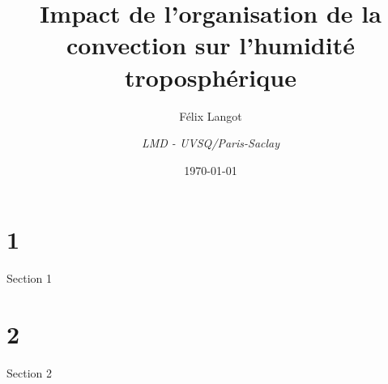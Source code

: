 \documentclass[10pt]{beamer}
\title{Impact de l'organisation de la convection sur l'humidité troposphérique}
\subtitle{Félix Langot}
\date{\today}
\author{\textit{LMD - UVSQ/Paris-Saclay}}
\institute{}
\begin{document}
\maketitle

\section*{1}
\begin{frame}{Section 1}
    
\end{frame}

\section*{2}
\begin{frame}{Section 2}
    
\end{frame}
\end{document}
